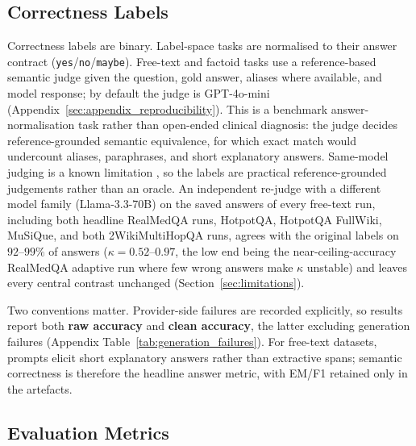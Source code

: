 \subsection{Correctness Labels}
\label{sec:correctness}

Correctness labels are binary.
Label-space tasks are normalised to their answer contract
(\texttt{yes}/\texttt{no}/\texttt{maybe}).
Free-text and factoid tasks use a reference-based semantic judge given the
question, gold answer, aliases where available, and model response; by default
the judge is GPT-4o-mini
(Appendix~\ref{sec:appendix_reproducibility}).
This is a benchmark answer-normalisation task rather than open-ended clinical
diagnosis: the judge decides reference-grounded semantic equivalence, for which
exact match would undercount aliases, paraphrases, and short explanatory
answers.
Same-model judging is a known limitation
\citep{zheng2023judging,panickssery2024llm}, so the labels are practical
reference-grounded judgements rather than an oracle.
An independent re-judge with a different model family (Llama-3.3-70B) on the
saved answers of every free-text run, including both headline RealMedQA runs,
HotpotQA, HotpotQA FullWiki, MuSiQue, and both 2WikiMultiHopQA runs, agrees
with the original labels on $92$--$99\%$ of answers
($\kappa = 0.52$--$0.97$, the low end being the near-ceiling-accuracy
RealMedQA adaptive run where few wrong answers make $\kappa$ unstable) and
leaves every central contrast unchanged (Section~\ref{sec:limitations}).

Two conventions matter.
Provider-side failures are recorded explicitly, so results report both
\textbf{raw accuracy} and \textbf{clean accuracy}, the latter excluding
generation failures (Appendix Table~\ref{tab:generation_failures}).
For free-text datasets, prompts elicit short explanatory answers rather than
extractive spans; semantic correctness is therefore the headline answer metric,
with EM/F1 retained only in the artefacts.

\subsection{Evaluation Metrics}

